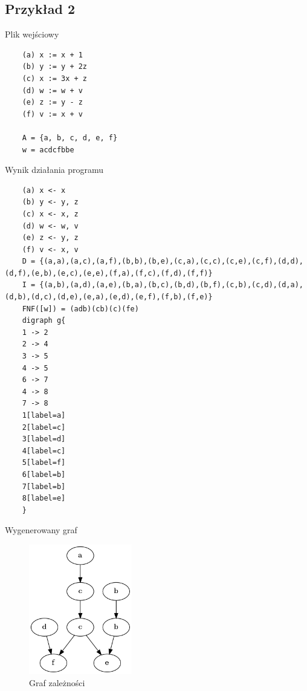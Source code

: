 \documentclass[12pt, letterpaper]{article}
\begin{document}
\subsection*{Przykład 2}
Plik wejściowy
\begin{lstlisting}
    (a) x := x + 1
    (b) y := y + 2z
    (c) x := 3x + z
    (d) w := w + v
    (e) z := y - z
    (f) v := x + v

    A = {a, b, c, d, e, f}
    w = acdcfbbe
\end{lstlisting}
Wynik działania programu
\begin{lstlisting}
    (a) x <- x
    (b) y <- y, z
    (c) x <- x, z
    (d) w <- w, v
    (e) z <- y, z
    (f) v <- x, v
    D = {(a,a),(a,c),(a,f),(b,b),(b,e),(c,a),(c,c),(c,e),(c,f),(d,d),(d,f),(e,b),(e,c),(e,e),(f,a),(f,c),(f,d),(f,f)}
    I = {(a,b),(a,d),(a,e),(b,a),(b,c),(b,d),(b,f),(c,b),(c,d),(d,a),(d,b),(d,c),(d,e),(e,a),(e,d),(e,f),(f,b),(f,e)}
    FNF([w]) = (adb)(cb)(c)(fe)
    digraph g{
    1 -> 2
    2 -> 4
    3 -> 5
    4 -> 5
    6 -> 7
    4 -> 8
    7 -> 8
    1[label=a]
    2[label=c]
    3[label=d]
    4[label=c]
    5[label=f]
    6[label=b]
    7[label=b]
    8[label=e]
    }
\end{lstlisting}
Wygenerowany graf
\begin{figure}[H]
    \centering
    \includegraphics[width=0.4\textwidth]{graph2.png}
    \caption{Graf zależności}
\end{figure}
\end{document}
